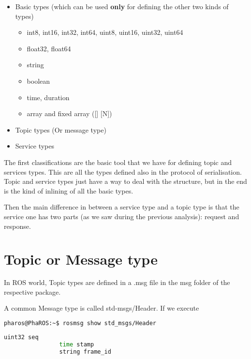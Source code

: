 \documentclass[a4paper,10pt,twoside]{book}
\begin{document}
				\begin{itemize}	
					\item Basic types (which can be used \textbf{only} for defining the other two kinds of types) \begin{itemize}	
							\item int8, int16, int32, int64,  uint8, uint16, uint32, uint64 
							\item float32, float64
							\item string
							\item boolean
							\item time, duration
							\item array and fixed array ([] [N])
						\end{itemize}
					\item Topic types (Or message type) 
					\item Service types
				\end{itemize}			
				
				
				The first classifications are the basic tool that we have for defining topic and services types. This are all the types defined also in the protocol of serialisation.  Topic and service types just have a way to deal with the structure, but in the end is the kind of inlining  of all the basic types.
				
				Then the main difference in between a service type and a topic type is that the service one has two parts (as we saw during the previous analysis): request and response.
				
				
				\section{Topic or Message type}
				
					In ROS world, Topic types are defined in a .msg file in the msg folder of the respective package. 
					
					A common Message type is called std-msgs/Header. If we execute 
					
			\begin{lstlisting}[language=bash,title={ Browsing Topic types }]
				pharos@PhaROS:~$ rosmsg show std_msgs/Header
			\end{lstlisting}
			
			
			 \begin{lstlisting}[language=bash,title={ std-msgs/Header definition }]
				uint32 seq
				time stamp
				string frame_id
			\end{lstlisting}
		 
\end{document}
